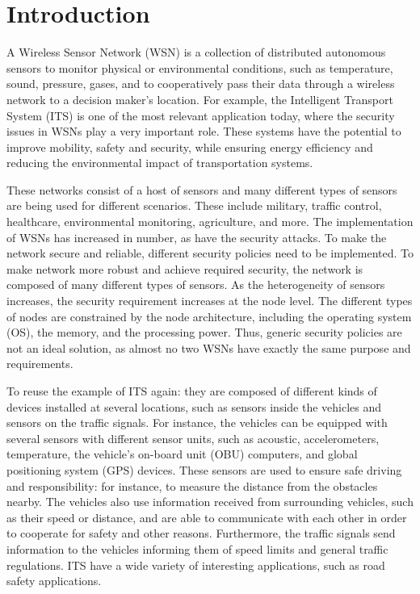 \documentclass[12pt,a4paper,twoside]{report}
\begin{document}
\section{Introduction}
A Wireless Sensor Network (WSN) is a collection of distributed autonomous sensors to monitor physical or environmental conditions, such as temperature, sound, pressure, gases, and to cooperatively pass their data through a wireless network to a decision maker's location. For example, the Intelligent Transport System (ITS) is one of the most relevant application today, where the security issues in WSNs play a very important role. These systems have the potential to improve mobility, safety and security, while ensuring energy efficiency and reducing the environmental impact of transportation systems. \par
These networks consist of a host of sensors and many different types of sensors are being used for different scenarios. These include military, traffic control, healthcare, environmental monitoring, agriculture, and more. The implementation of WSNs has increased in number, as have the security attacks. To make the network secure and reliable, different security policies need to be implemented. To make network more robust and achieve required security, the network is composed of many different types of sensors. As the heterogeneity of sensors increases, the security requirement increases at the node level. The different types of nodes are constrained by the node architecture, including the operating system (OS), the memory, and the processing power. Thus, generic security policies are not an ideal solution, as almost no two WSNs have exactly the same purpose and requirements.\par
To reuse the example of ITS again: they are composed of different kinds of devices installed at several locations, such as sensors inside the vehicles and sensors on the traffic signals. For instance, the vehicles can be equipped with several sensors with different sensor units, such as acoustic, accelerometers, temperature, the vehicle's on-board unit (OBU) computers, and global positioning system (GPS) devices. These sensors are used to ensure safe driving and responsibility: for instance, to measure the distance from the obstacles nearby. The vehicles also use information received from surrounding vehicles, such as their speed or distance, and are able to communicate with each other in order to cooperate for safety and other reasons. Furthermore, the traffic signals send information to the vehicles informing them of speed limits and general traffic regulations. ITS have a wide variety of interesting applications, such as road safety applications.\par
\end{document}
